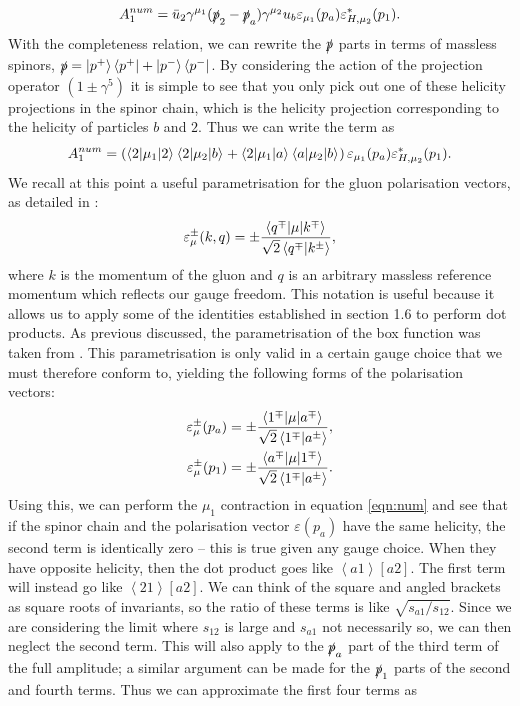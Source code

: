\begin{equation}
A_1^{num} = \bar{u}_2 \gamma^{\mu_1}(\slashed{p}_2-\slashed{p}_a)\gamma^{\mu_2}u_b \varepsilon_{\mu_1}(p_a)\varepsilon^*_{H,\mu_2}(p_1).
\end{equation}
With the completeness relation, we can rewrite the $\slashed{p}$ parts in terms of massless spinors,  $\slashed{p} = \left| p^+ \right> \left<p^+ \right| + \left| p^- \right> \left<p^- \right|$. By considering the action of the projection operator $(1\pm \gamma^5)$ it is simple to see that you only pick out one of these helicity projections in the spinor chain, which is the helicity projection corresponding to the helicity of particles $b$ and $2$. Thus we can write the term as
\begin{equation}
A_1^{num} = \left(\mathinner{\langle2\vert\mu_1\vert2\rangle}_{}\mathinner{\langle2\vert\mu_2\vert b\rangle}_{} + \mathinner{\langle2\vert\mu_1\vert a\rangle}_{}\mathinner{\langle a\vert\mu_2\vert b\rangle}_{}\right)\varepsilon_{\mu_1}(p_a)\varepsilon^*_{H,\mu_2}(p_1).
\label{eqn:num}
\end{equation}
We recall at this point a useful parametrisation for the gluon polarisation vectors, as detailed in \cite{Dixon1996}:
\begin{equation}
\varepsilon_\mu^{\pm}(k,q) = \pm \frac{\mathinner{\langle q^\mp\vert\mu\vert k^\mp\rangle}_{}}{\sqrt{2} \left<q^\mp | k^\pm \right>},
\end{equation}
where $k$ is the momentum of the gluon and $q$ is an arbitrary massless reference momentum which reflects our gauge freedom. This notation is useful because it allows us to apply some of the identities established in section 1.6 to perform dot products. As previous discussed, the parametrisation of the box function was taken from \cite{Duca2003}. This parametrisation is only valid in a certain gauge choice that we must therefore conform to, yielding the following forms of the polarisation vectors:
\begin{equation}
\begin{split}
\varepsilon_\mu^{\pm}(p_a) &= \pm \frac{\mathinner{\langle1^\mp\vert\mu\vert a^\mp\rangle}_{}}{\sqrt{2} \left<1^\mp | a^\pm \right>}, \\
\varepsilon_\mu^{\pm}(p_1) &= \pm \frac{\mathinner{\langle a^\mp\vert\mu\vert1^\mp\rangle}_{}}{\sqrt{2} \left<1^\mp | a^\pm \right>}.
\end{split}
\end{equation}
Using this, we can perform the $\mu_1$ contraction in equation \ref{eqn:num} and see that if the spinor chain and the polarisation vector $\varepsilon(p_a)$ have the same helicity, the second term is identically zero -- this is true given any gauge choice. When they have opposite helicity, then the dot product goes like $\left<a 1 \right> [ a 2]$. The first term will instead go like $\left<2 1 \right>[a 2]$. We can think of the square and angled brackets as square roots of invariants, so the ratio of these terms is like $\sqrt{s_{a1}/s_{12}}$. Since we are considering the limit where $s_{12}$ is large and $s_{a1}$ not necessarily so, we can then neglect the second term. This will also apply to the $\slashed{p}_a$ part of the third term of the full amplitude; a similar argument can be made for the $\slashed{p}_1$ parts of the second and fourth terms. Thus we can approximate the first four terms as %
